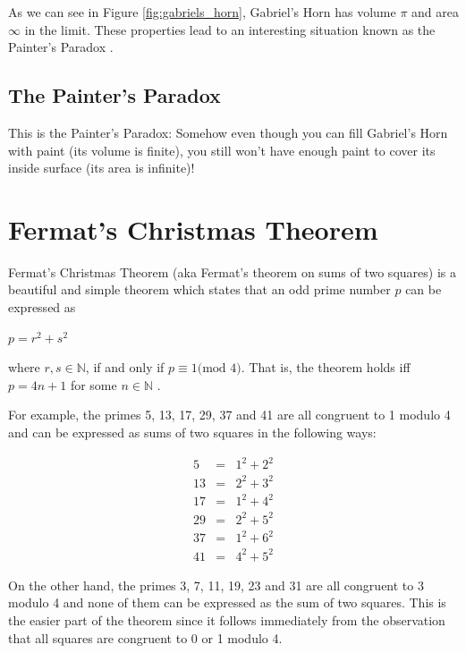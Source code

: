\documentclass{article}
\theoremstyle{definition}
\begin{document}
\bigskip
\noindent
As we can see in Figure \ref{fig:gabriels_horn}, Gabriel's Horn
has volume $\pi$ and area $\infty$ in the limit. These properties
lead to an interesting situation known as the Painter's Paradox
\cite{painters_paradox_2,painters_paradox,painters_paradox_1}.
%
%
%
\subsection{The Painter's Paradox}
This is the Painter's Paradox: Somehow even though you can 
fill Gabriel's Horn with paint (its volume is finite), you 
still won't have enough paint to cover its inside surface 
(its area is infinite)!
%
%
%
\section{Fermat's Christmas Theorem}
%
%
%
\noindent
Fermat's Christmas Theorem (aka Fermat's theorem on sums of two
squares) is a beautiful and simple
theorem which states that an odd prime number $p$ can be
expressed as

\smallskip
\begin{center}
\scalebox{1.25} {$p = r^{2} + s^{2}$}
\end{center}

\smallskip
\noindent
where $r,s \in \mathbb{N}$, if and only if $p \equiv 1 \textrm{
(mod $4$)}$. That is, the theorem holds iff $p = 4n + 1$ for some
$n \in \mathbb{N}$ \cite{wiki:christmas_theorem}.

\bigskip
\noindent
For example, the primes 5, 13, 17, 29, 37 and 41 are all
congruent to 1 modulo 4 and can be expressed as sums of two
squares in the following ways:

\smallskip
\begin{equation*}
\begin{array}{rcll} 
5   &=& 1^{2} + 2^{2}   \\
13  &=& 2^{2} + 3^{2}   \\
17  &=& 1^{2} + 4^{2}   \\
29  &=& 2^{2} + 5^{2}   \\
37  &=& 1^{2} + 6^{2}   \\
41  &=& 4^{2} + 5^{2}
\end{array}
\end{equation*}


\bigskip
\noindent
On the other hand, the primes 3, 7, 11, 19, 23 and 31 are all
congruent to 3 modulo 4 and none of them can be expressed as the
sum of two squares. This is the easier part of the theorem since
it follows immediately from the observation that all squares are
congruent to 0 or 1 modulo 4.
\end{document}
